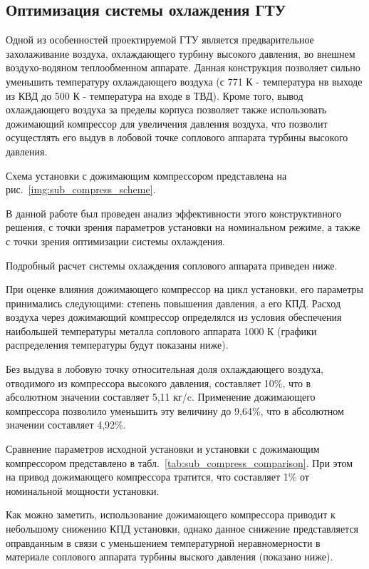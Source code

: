 \subsection{Оптимизация системы охлаждения ГТУ}
Одной из особенностей проектируемой ГТУ является предварительное захолаживание воздуха, охлаждающего турбину высокого
давления, во внешнем воздухо-водяном теплообменном аппарате. Данная конструкция позволяет сильно уменьшить температуру
охлаждающего воздуха (с 771 К - температура нв выходе из КВД до 500 К - температура на входе в ТВД). Кроме того,
вывод охлаждающего воздуха за пределы корпуса позволяет также использовать дожимающий компрессор для увеличения
давления воздуха, что позволит осущестлять его выдув в лобовой точке соплового аппарата турбины высокого давления.

Схема установки с дожимающим компрессором представлена на рис.~\ref{img:sub_compress_scheme}.

В данной работе был проведен анализ эффективности этого конструктивного решения, с точки зрения параметров установки на номинальном режиме, а также с точки зрения оптимизации системы охлаждения. 

Подробный расчет системы охлаждения соплового аппарата приведен ниже.

При оценке влияния дожимающего компрессор на цикл установки, его параметры принимались следующими: степень
повышения давления, а его КПД.
Расход воздуха через дожимающий компрессор определялся из условия обеспечения наибольшей температуры металла соплового аппарата 1000 К (графики распределения температуры будут показаны ниже).

Без выдува в лобовую точку относительная доля охлаждающего воздуха, отводимого из компрессора высокого давления, составляет 10\%, что в абсолютном значении составляет 5,11 кг/c. Применение дожимающего компрессора позволило уменьшить эту величину до 9,64\%, что в абсолютном значении составляет 4,92\%.

Сравнение параметров исходной установки и установки с дожимающим компрессором представлено в табл.~\ref{tab:sub_compress_comparison}.
При этом на привод дожимающего компрессора тратится, что составляет 1\% от номинальной мощности
установки.

Как можно заметить, использование дожимающего компрессора приводит к небольшому снижению КПД установки, однако данное снижение представляется оправданным в связи с уменьшением температурной неравномерности в материале соплового аппарата турбины выского давления (показано ниже).